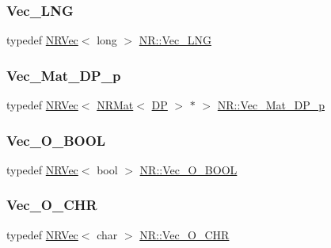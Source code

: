 \mbox{\label{namespaceNR_a815b8cf6e3ded65e3394a3f631d9d2e2}} 
\subsubsection{\texorpdfstring{Vec\_LNG}{Vec\_LNG}}
{\footnotesize\ttfamily typedef \mbox{\hyperlink{classNR_1_1NRVec}{N\+R\+Vec}}$<$ long $>$ \mbox{\hyperlink{namespaceNR_a815b8cf6e3ded65e3394a3f631d9d2e2}{N\+R\+::\+Vec\+\_\+\+L\+NG}}}

\mbox{\label{namespaceNR_a13068a6bad16c3da37efbb289aae5b97}} 
\subsubsection{\texorpdfstring{Vec\_Mat\_DP\_p}{Vec\_Mat\_DP\_p}}
{\footnotesize\ttfamily typedef \mbox{\hyperlink{classNR_1_1NRVec}{N\+R\+Vec}}$<$ \mbox{\hyperlink{classNR_1_1NRMat}{N\+R\+Mat}}$<$ \mbox{\hyperlink{namespaceNR_af6ff762dd605ff477b8e52387253a02a}{DP}} $>$ $\ast$ $>$ \mbox{\hyperlink{namespaceNR_a13068a6bad16c3da37efbb289aae5b97}{N\+R\+::\+Vec\+\_\+\+Mat\+\_\+\+D\+P\+\_\+p}}}

\mbox{\label{namespaceNR_a7978b7ffdafb07629b4165a7be29d1d5}} 
\subsubsection{\texorpdfstring{Vec\_O\_BOOL}{Vec\_O\_BOOL}}
{\footnotesize\ttfamily typedef \mbox{\hyperlink{classNR_1_1NRVec}{N\+R\+Vec}}$<$ bool $>$ \mbox{\hyperlink{namespaceNR_a7978b7ffdafb07629b4165a7be29d1d5}{N\+R\+::\+Vec\+\_\+\+O\+\_\+\+B\+O\+OL}}}

\mbox{\label{namespaceNR_a12f1014df3e5efa305fbf80c51c707b5}} 
\subsubsection{\texorpdfstring{Vec\_O\_CHR}{Vec\_O\_CHR}}
{\footnotesize\ttfamily typedef \mbox{\hyperlink{classNR_1_1NRVec}{N\+R\+Vec}}$<$ char $>$ \mbox{\hyperlink{namespaceNR_a12f1014df3e5efa305fbf80c51c707b5}{N\+R\+::\+Vec\+\_\+\+O\+\_\+\+C\+HR}}}

